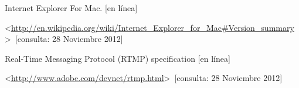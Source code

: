 \begin{thebibliography}{99}
\begin{sloppypar}
%
Internet Explorer For Mac. [en línea]\

\textless \url{http://en.wikipedia.org/wiki/Internet_Explorer_for_Mac\#Version_summary}\textgreater \ [consulta: 28 Noviembre 2012]

%
Real-Time Messaging Protocol (RTMP) specification [en línea]\

\textless \url{http://www.adobe.com/devnet/rtmp.html}\textgreater \ [consulta: 28 Noviembre 2012]

\end{sloppypar}
\end{thebibliography}
